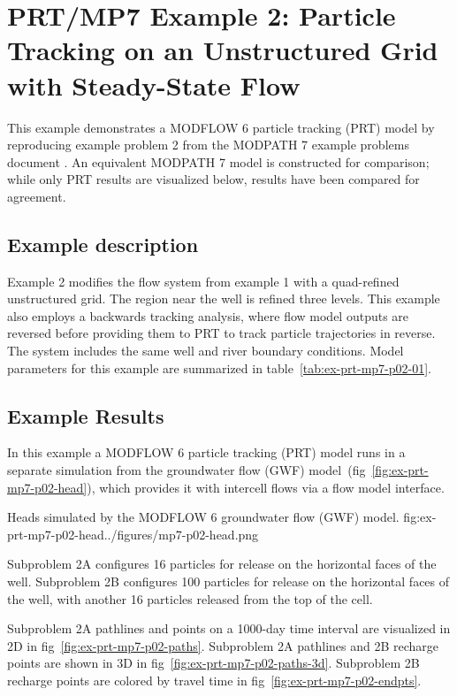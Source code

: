 \section{PRT/MP7 Example 2: Particle Tracking on an Unstructured Grid with Steady-State Flow}

This example demonstrates a MODFLOW 6 particle tracking (PRT) model by reproducing example problem 2 from the MODPATH 7 \citep{pollock2016modpath7} example problems document \citep{modpath7examples}. An equivalent MODPATH 7 model is constructed for comparison; while only PRT results are visualized below, results have been compared for agreement.

\subsection{Example description}

Example 2 modifies the flow system from example 1 with a quad-refined unstructured grid. The region near the well is refined three levels. This example also employs a backwards tracking analysis, where flow model outputs are reversed before providing them to PRT to track particle trajectories in reverse. The system includes the same well and river boundary conditions. Model parameters for this example are summarized in table~\ref{tab:ex-prt-mp7-p02-01}.



\subsection{Example Results}

In this example a MODFLOW 6 particle tracking (PRT) model runs in a separate simulation from the groundwater flow (GWF) model~(fig~\ref{fig:ex-prt-mp7-p02-head}), which provides it with intercell flows via a flow model interface.

\begin{StandardFigure}{
    Heads simulated by the MODFLOW 6 groundwater flow (GWF) model.
    }{fig:ex-prt-mp7-p02-head}{../figures/mp7-p02-head.png}
\end{StandardFigure}

Subproblem 2A configures 16 particles for release on the horizontal faces of the well. Subproblem 2B configures 100 particles for release on the horizontal faces of the well, with another 16 particles released from the top of the cell.

Subproblem 2A pathlines and points on a 1000-day time interval are visualized in 2D in fig~\ref{fig:ex-prt-mp7-p02-paths}. Subproblem 2A pathlines and 2B recharge points are shown in 3D in fig~\ref{fig:ex-prt-mp7-p02-paths-3d}. Subproblem 2B recharge points are colored by travel time in fig~\ref{fig:ex-prt-mp7-p02-endpts}.


